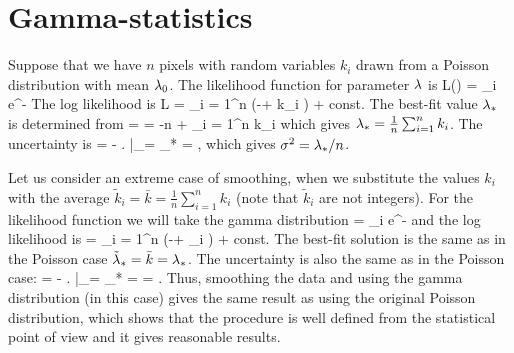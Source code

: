 \newpage
\section{Gamma-statistics}

Suppose that we have $n$ pixels with random variables $k_i$ drawn from a Poisson distribution with mean $\lambda_0$.
The likelihood function for parameter $\lambda$ is
\be
L(\ld) = \prod_i  e^{-\ld}
\ee
The log likelihood is
\be
\log L = \sum_{i = 1}^n (-\ld + k_i \log \ld) + const.
\ee
The best-fit value $\lambda_*$ is determined from
 =  = -n +  \sum_{i = 1}^n k_i
\ee
which gives $\lambda_* = \frac{1}{n} \sum_{i = 1}^n k_i$.
The uncertainty is
\be
{} = - \left.  \right|_{\ld = \ld_*} = ,
\ee
which gives $\sigma^2 = \lambda_* / n$.

Let us consider an extreme case of smoothing, when we substitute the values $k_i$ with the average $\tilde{k}_i = \bar{k} = \frac{1}{n} \sum_{i = 1}^n k_i$
(note that $\tilde{k}_i$ are not integers).
For the likelihood function we will take the gamma distribution
\be
{} = \prod_i  e^{-\ld}
\ee
and the log likelihood is
\be
\log {} = \sum_{i = 1}^n (-\ld + _i \log \ld) + const.
\ee
The best-fit solution is the same as in the Poisson case $\tilde{\lambda}_* = \bar{k} = {\lambda}_*$.
The uncertainty is also the same as in the Poisson case:
\be
{} = - \left.  \right|_{\ld = \td{\ld}_*} =  = .
\ee
Thus, smoothing the data and using the gamma distribution (in this case) gives the same result as using the original Poisson distribution,
which shows that the procedure is well defined from the statistical point of view and it gives reasonable results.